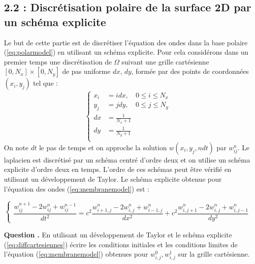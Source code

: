 \documentclass[a4,12pt]{article}
\newcounter{Nbquestion}
\newcommand*\question{%
\stepcounter{Nbquestion}%
\textbf{Question \theNbquestion. }}
\begin{document}
        \subsection*{2.2 : Discrétisation polaire de la surface 2D par un schéma explicite }
        Le but de cette partie est de discrétiser l'équation des ondes dans la base polaire (\ref{eq:polarmodel}) en utilisant un schéma explicite. Pour cela considérons dans un premier temps une discrétisation de $\Omega $ suivant une grille cartésienne $[0,N_x]\times [0,N_y]$ de pas uniforme $dx$, $dy$, formée par des points de coordonnées $(x_i,y_j)$ tel que :
        \begin{equation*}{}
        \left\{
        \begin{array}{rl}
        x_i &=i dx,\quad 0\leq i \leq N_x \\
              y_j &=j dy,\quad  0\leq j \leq N_y \\
              dx & =\frac{1}{N_x+1}\\
              dy &=\frac{1}{N_y+1}\\
              \end{array}
              \right.
              \end{equation*}
              On note $dt$ le pas de temps et on approche la solution $w(x_i,y_j,ndt)$ par $w_{ij}^{n}$. Le laplacien est discrétisé  par un schéma centré d'ordre deux  et on utilise un schéma explicite d'ordre deux en temps. L'ordre de ces schémas peut être vérifié en utilisant un développement de Taylor. Le schéma explicite obtenue pour l'équation des ondes (\ref{eq:membranemodel}) est :

              \begin{equation}
              \left\{
              \begin{array}{rl}
              \dfrac{w_{ij}^{n+1}-2w_{ij}^{n}+w_{ij}^{n-1}}{dt^{2}}=c^2\dfrac{w_{i+1,j}^{n}-2w_{i,j}^{n}+w_{i-1,j}^{n}}
{dx^{2}}+c^2\dfrac{w_{i,j+1}^{n}-2w_{i,j}^{n}+w_{i,j-1}^{n}}{dy^{2}}
\end{array}
\right.
\label{eq:diffcartesiennes}
\end{equation}


\question En utilisant un développement de Taylor  et le  schéma explicite (\ref{eq:diffcartesiennes}) écrire les conditions initiales et les conditions limites de l'équation (\ref{eq:membranemodel}) obtenues pour $w_{i,j}^0,w_{i,j}^1$ sur la grille cartésienne.

\end{document}
